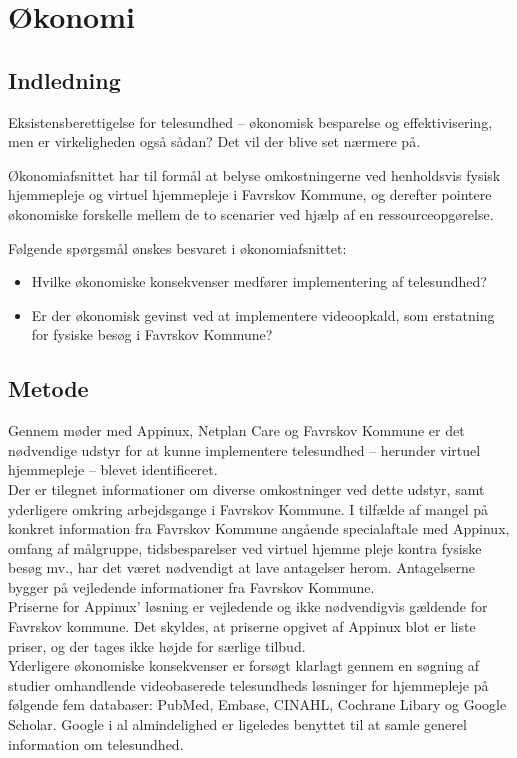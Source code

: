 \chapter{Økonomi}
\section{Indledning}
Eksistensberettigelse for telesundhed – økonomisk besparelse og effektivisering, men er virkeligheden også sådan? Det vil der blive set nærmere på.

Økonomiafsnittet har til formål at belyse omkostningerne ved henholdsvis fysisk hjemmepleje og virtuel hjemmepleje i Favrskov Kommune, og derefter pointere økonomiske forskelle mellem de to scenarier ved hjælp af en ressourceopgørelse.

Følgende spørgsmål ønskes besvaret i økonomiafsnittet:\\
\begin{itemize}
	\item Hvilke økonomiske konsekvenser medfører implementering af telesundhed?
	\item Er der økonomisk gevinst ved at implementere videoopkald, som erstatning for fysiske besøg i Favrskov Kommune?
\end{itemize}

\section{Metode}
Gennem møder med Appinux, Netplan Care og Favrskov Kommune er det nødvendige udstyr for at kunne implementere telesundhed – herunder virtuel hjemmepleje – blevet identificeret.\\
Der er tilegnet informationer om diverse omkostninger ved dette udstyr, samt yderligere omkring arbejdsgange i Favrskov Kommune. 
I tilfælde af mangel på konkret information fra Favrskov Kommune angående specialaftale med Appinux, omfang af målgruppe, tidsbesparelser ved virtuel hjemme pleje kontra fysiske besøg mv., har det været nødvendigt at lave antagelser herom. Antagelserne bygger på vejledende informationer fra Favrskov Kommune.\\
Priserne for Appinux’ løsning er vejledende og ikke nødvendigvis gældende for Favrskov kommune. Det skyldes, at priserne opgivet af Appinux blot er liste priser, og der tages ikke højde for særlige tilbud.\\
Yderligere økonomiske konsekvenser er forsøgt klarlagt gennem en søgning af studier omhandlende videobaserede telesundheds løsninger for hjemmepleje på følgende fem databaser: PubMed, Embase, CINAHL, Cochrane Libary og Google Scholar. Google i al almindelighed er ligeledes benyttet til at samle generel information om telesundhed. 


